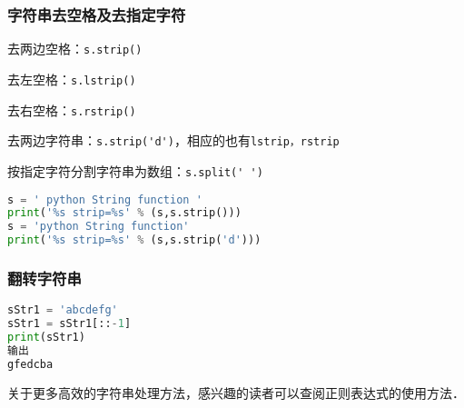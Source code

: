 \subsubsection{字符串去空格及去指定字符}

去两边空格：\verb|s.strip()|

去左空格：\verb|s.lstrip()|

去右空格：\verb|s.rstrip()|

去两边字符串：\verb|s.strip('d')|，相应的也有\verb|lstrip，rstrip|

按指定字符分割字符串为数组：\verb|s.split(' ')|

\begin{lstlisting}[language=python]
s = ' python String function '
print('%s strip=%s' % (s,s.strip()))
s = 'python String function'
print('%s strip=%s' % (s,s.strip('d')))
\end{lstlisting}

\subsubsection{翻转字符串}
\begin{lstlisting}[language=python]
sStr1 = 'abcdefg'
sStr1 = sStr1[::-1]
print(sStr1)
输出
gfedcba
\end{lstlisting}

关于更多高效的字符串处理方法，感兴趣的读者可以查阅正则表达式的使用方法．

